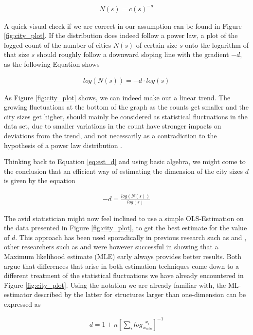 \documentclass{article}[12pt]
\begin{document}
\begin{align}
N(s) = c(s)^{-d}
\label{eq:city}
\end{align}

A quick visual check if we are correct in our assumption can be found in Figure \ref{fig:city_plot}. If the distribution does indeed follow a power law, a plot of the logged count of the number of cities $N(s)$ of certain size $s$ onto the logarithm of that size $s$ should roughly follow a downward sloping line with the gradient $-d$, as the following Equation shows

\begin{align}
log(N(s)) = -d \cdot log(s)
\label{eq:d_slope}
\end{align}

As Figure \ref{fig:city_plot} shows, we can indeed make out a linear trend. The growing fluctuations at the bottom of the graph as the counts get smaller and the city sizes get higher, should mainly be considered as statistical fluctuations in the data set, due to smaller variations in the count have stronger impacts on deviations from the trend, and not necessarily as a contradiction to the hypothesis of a power law distribution \citep{newman2005power}.

Thinking back to Equation \ref{eq:est_d} and using basic algebra, we might come to the conclusion that an efficient way of estimating the dimension of the city sizes $d$ is given by the equation

\begin{align}
-d =  \frac{log(N(s))}{log(s)}
\label{eq:est_d}
\end{align}


The avid statistician might now feel inclined to use a simple OLS-Estimation on the data presented in Figure \ref{fig:city_plot}, to get the best estimate for the value of $d$. This approach has been used sporadically in previous research such as \cite{cioffi2013power} and \cite{ takayasu2000fractal}, other researchers such as \cite{clauset2009power}and \cite{newman2005power} were however successful in showing that a Maximum likelihood estimate (MLE) early always provides better results. Both argue that differences that arise in both estimation techniques come down to a different treatment of the statistical fluctuations we have already encountered in Figure \ref{fig:city_plot}. Using the notation we are already familiar with, the ML-estimator described by the latter for structures larger than one-dimension can be expressed as

\begin{align}
d = 1+ n\left[  \sum\limits_{i} log \frac{x_i}{x_{min}}  \right]^{-1}
\label{eq:d_mle}
\end{align}
\end{document}
